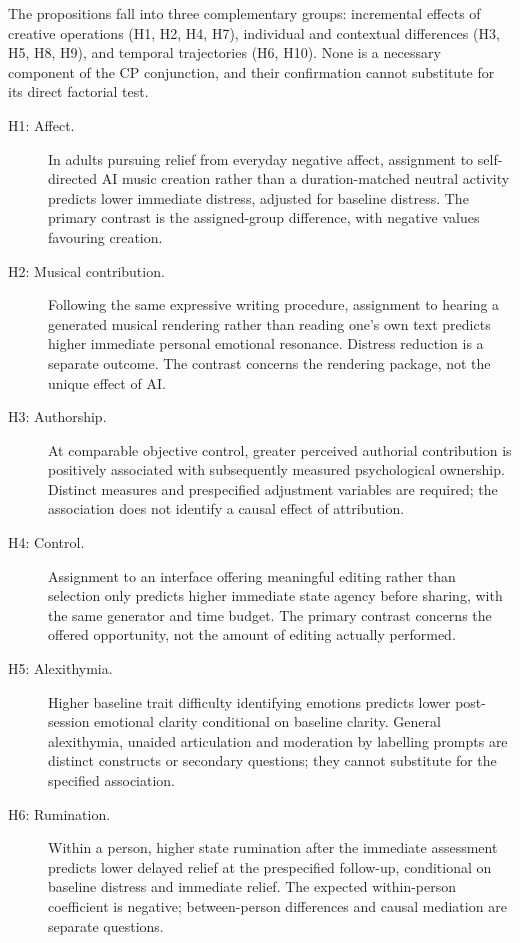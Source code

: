\documentclass[11pt,a4paper]{article}
\begin{document}
The propositions fall into three complementary groups: incremental effects of creative operations (H1, H2, H4, H7), individual and contextual differences (H3, H5, H8, H9), and temporal trajectories (H6, H10). None is a necessary component of the CP conjunction, and their confirmation cannot substitute for its direct factorial test.

\begin{description}
\item[H1: Affect.] In adults pursuing relief from everyday negative affect, assignment to self-directed AI music creation rather than a duration-matched neutral activity predicts lower immediate distress, adjusted for baseline distress. The primary contrast is the assigned-group difference, with negative values favouring creation.
\item[H2: Musical contribution.] Following the same expressive writing procedure, assignment to hearing a generated musical rendering rather than reading one's own text predicts higher immediate personal emotional resonance. Distress reduction is a separate outcome. The contrast concerns the rendering package, not the unique effect of AI.
\item[H3: Authorship.] At comparable objective control, greater perceived authorial contribution is positively associated with subsequently measured psychological ownership. Distinct measures and prespecified adjustment variables are required; the association does not identify a causal effect of attribution.
\item[H4: Control.] Assignment to an interface offering meaningful editing rather than selection only predicts higher immediate state agency before sharing, with the same generator and time budget. The primary contrast concerns the offered opportunity, not the amount of editing actually performed.
\item[H5: Alexithymia.] Higher baseline trait difficulty identifying emotions predicts lower post-session emotional clarity conditional on baseline clarity. General alexithymia, unaided articulation and moderation by labelling prompts are distinct constructs or secondary questions; they cannot substitute for the specified association.
\item[H6: Rumination.] Within a person, higher state rumination after the immediate assessment predicts lower delayed relief at the prespecified follow-up, conditional on baseline distress and immediate relief. The expected within-person coefficient is negative; between-person differences and causal mediation are separate questions.

\end{description}
\end{document}
